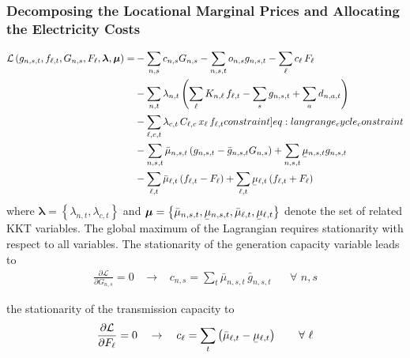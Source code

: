\documentclass[11pt]{article}
\newcommand{\ubar}[1]{\underaccent{\bar}{#1}}
\newcommand{\generation}[1][n]{g_{#1,s,t}}
\newcommand{\generationpotential}{\bar{g}_{n,s,t}}
\newcommand{\capacityGeneration}{G_{n,s}}
\newcommand{\capacityFlow}{F_{\ell}}
\newcommand{\capexGeneration}{c_{n,s}}
\newcommand{\capexFlow}{c_{\ell}}
\newcommand{\opexGeneration}[1][n]{o_{#1,s}}
\newcommand{\demand}[1][n]{d_{#1,a,t}}
\newcommand{\incidence}[1][n]{K_{#1,\ell}}
\newcommand{\mulowergeneration}[1][n]{\ubar{\mu}_{#1,s,t}}
\newcommand{\muuppergeneration}[1][n]{\bar{\mu}_{#1,s,t}}
\newcommand{\mulowerflow}{\ubar{\mu}_{\ell,t}}
\newcommand{\muupperflow}{\bar{\mu}_{\ell,t}}
\newcommand{\lmp}[1][n]{\lambda_{#1,t}}
\newcommand{\flow}{f_{\ell,t}}
\newcommand{\cycle}{C_{\ell,c}}
\newcommand{\impedance}{x_\ell}
\newcommand{\cycleprice}{\lambda_{c,t}}
\newcommand{\lagrangian}{\mathcal{L}}
\newcommand{\Forall}[1]{\hspace{20pt} \forall \,\, #1 }
\newcommand{\pdv}[2]{\frac{\partial #1}{\partial #2}}
\begin{document}
\subsubsection*{Decomposing the Locational Marginal Prices and Allocating the Electricity Costs}
\begin{align}
 \lagrangian\left(\generation, \flow, \capacityGeneration, \capacityFlow, \boldsymbol{\lambda}, \boldsymbol{\mu} \right)   = &- \sum_{n,s} \capexGeneration \capacityGeneration - \sum_{n, s, t} \opexGeneration \generation - \sum_{\ell} \capexFlow \, \capacityFlow  \\
 &- \sum_{n,t} \lmp \left(\sum_\ell \incidence \, \flow  - \sum_s \generation + \sum_a \demand  \right)  \\ 
 &- \sum_{\ell,c,t} \cycleprice \, \cycle \, \impedance \, \flow  \label[constraint]{eq:langrange_cycle_constraint} \\ 
 &- \sum_{n,s,t} \muuppergeneration \left( \generation - \generationpotential \capacityGeneration \right)  + \sum_{n,s,t} \mulowergeneration \generation  \\
 &- \sum_{\ell,t} \muupperflow \left( \flow - \capacityFlow \right) + \sum_{\ell,t} \mulowerflow \left( \flow + \capacityFlow \right)     
\end{align}
% 
where $\boldsymbol{\lambda} = \left\lbrace \lmp, \cycleprice \right\rbrace $ and $\boldsymbol{\mu} = \left\lbrace \muuppergeneration, \mulowergeneration, \muupperflow, \mulowerflow \right\rbrace $ denote the set of related KKT variables. The global maximum of the Lagrangian requires stationarity with respect to all variables. The stationarity of the generation capacity variable leads to 
\begin{align}
 \pdv{\lagrangian}{\capacityGeneration}  = 0 \hspace{10pt} \rightarrow \hspace{10pt} \capexGeneration =  \sum_t \muuppergeneration \, \generationpotential  \Forall{n,s}
 \label{eq:capexGeneration_duality}
\end{align}

the stationarity of the transmission capacity to
\begin{align}
 \pdv{\lagrangian}{\capacityFlow} = 0 \hspace{10pt} \rightarrow \hspace{10pt} \capexFlow =  \sum_t \left( \muupperflow - \mulowerflow \right) \Forall{\ell}
 \label{eq:capexFlow_duality}
\end{align}
\end{document}

